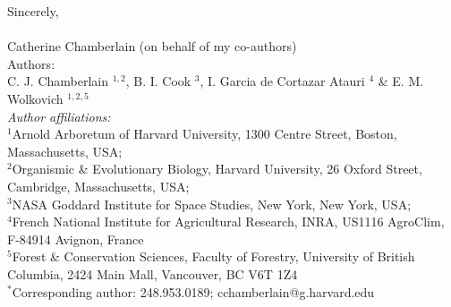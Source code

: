 \documentclass[11pt,a4paper]{article}\usepackage[]{graphicx}\usepackage[]{color}
\begin{document}
\vspace{1.5ex}
\noindent Sincerely, \\
\vspace{3ex}\\
\noindent Catherine Chamberlain (on behalf of my co-authors)
\vspace{2ex}\\
\noindent Authors:\\
C. J. Chamberlain $^{1,2}$, B. I. Cook $^{3}$, I. Garcia de Cortazar Atauri $^{4}$ \& E. M. Wolkovich $^{1,2,5}$
\vspace{2ex}\\
\emph{Author affiliations:}\\
$^{1}$Arnold Arboretum of Harvard University, 1300 Centre Street, Boston, Massachusetts, USA; \\
$^{2}$Organismic \& Evolutionary Biology, Harvard University, 26 Oxford Street, Cambridge, Massachusetts, USA; \\
$^{3}$NASA Goddard Institute for Space Studies, New York, New York, USA; \\
$^{4}$French National Institute for Agricultural Research, INRA, US1116 AgroClim, F-84914 Avignon, France\\
$^{5}$Forest \& Conservation Sciences, Faculty of Forestry, University of British Columbia, 2424 Main Mall, Vancouver, BC V6T 1Z4\\
\vspace{2ex}
$^*$Corresponding author: 248.953.0189; cchamberlain@g.harvard.edu\\


\newpage
\nocite{Vitasse2014}
\nocite{Vitasse2014a}
\nocite{Xie2015}
\nocite{Zohner2016}
\nocite{Lenz2016}
\nocite{Hofmann2015}
\nocite{Kollas2014}
\nocite{Dolezal2016}
\nocite{Xin2016}
\nocite{Lenz2013}
\nocite{Muffler2016}

\end{document}
